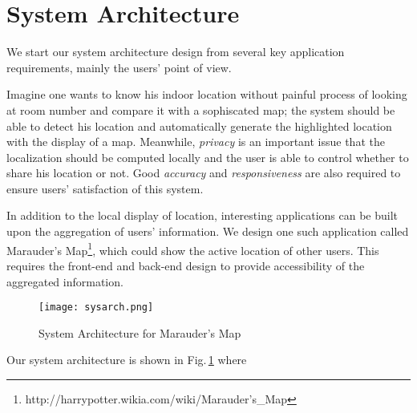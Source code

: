 \section{System Architecture}
\label{sec:system-architecture}
We start our system architecture design from several key application requirements, mainly the users' point of view.

Imagine one wants to know his indoor location without painful process of looking at room number and compare it with a sophiscated map; the system should be able to detect his location and automatically generate the highlighted location with the display of a map. Meanwhile, {\em privacy} is an important issue that the localization should be computed locally and the user is able to control whether to share his location or not. Good {\em accuracy} and {\em responsiveness} are also required to ensure users' satisfaction of this system. 

In addition to the local display of location, interesting applications can be built upon the aggregation of users' information. We design one such application called Marauder's Map\footnote{http://harrypotter.wikia.com/wiki/Marauder's\_Map}, which could show the active location of other users. This requires the front-end and back-end design to provide accessibility of the aggregated information.


\begin{figure}
  \centering
  \texttt{[image: sysarch.png]}
  \caption{System Architecture for Marauder's Map}
  \label{fig:sysarch}
\end{figure}

Our system architecture is shown in Fig.\,\ref{fig:sysarch} where 
